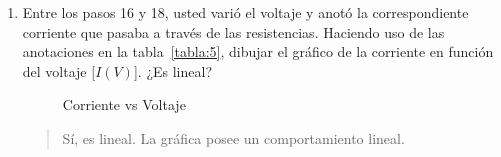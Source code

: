\documentclass{article}
\begin{document}
\begin{enumerate}[label=\alph*.-]
        Para cada montaje:
        
        \[
            {R_1}_{\text{err}} = \left|\frac{1470 - 1459}{1459}\right| \times 100\% = 0.75\%
        \]
        \[
            {R_2}_{\text{err}} = \left|\frac{3470 - 3410}{3410}\right| \times 100\% = 1.76\%
        \]
        \[
            {R_3}_{\text{err}} = \left|\frac{319.73 - 318.2}{318.2}\right| \times 100\% = 0.48\%
        \]
        \[
            {R_4}_{\text{err}} = \left|\frac{275.66 - 273.6}{273.6}\right| \times 100\% = 0.75\%
        \]
        
        \item Entre los pasos 16 y 18, usted varió el voltaje y anotó la correspondiente corriente que pasaba a través de las resistencias. Haciendo uso de las anotaciones en la tabla~\ref{tabla:5}, dibujar el gráfico de la corriente en función del voltaje [$I(V)$]. ¿Es lineal?
        
        \begin{figure}[ht]
            \begin{center}
            \end{center}
            \caption{Corriente vs Voltaje}\label{fig:C}
        \end{figure}

        \begin{quote}
            Sí, es lineal. La gráfica posee un comportamiento lineal.
        \end{quote}
        

\end{enumerate}
\end{document}
